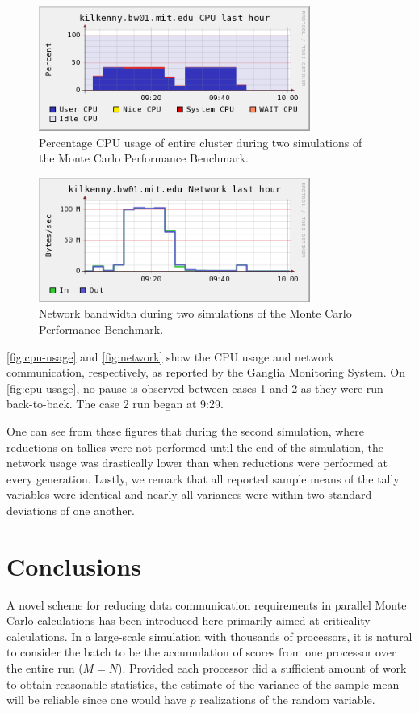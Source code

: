 \begin{figure}[ht]
  \centering
  \includegraphics[width=3.5in]{figures/ch4/cpu_usage.png}
  \caption{Percentage CPU usage of entire cluster during two simulations of the
    Monte Carlo Performance Benchmark.}
  \label{fig:cpu-usage}
\end{figure}
\begin{figure}[ht]
  \centering
  \includegraphics[width=3.5in]{figures/ch4/network.png}
  \caption{Network bandwidth during two simulations of the Monte Carlo
    Performance Benchmark.}
  \label{fig:network}
\end{figure}
\autoref{fig:cpu-usage} and \autoref{fig:network} show the CPU usage and network
communication, respectively, as reported by the Ganglia Monitoring System. On
\autoref{fig:cpu-usage}, no pause is observed between cases 1 and 2 as they were
run back-to-back. The case 2 run began at 9:29.

One can see from these figures that during the second simulation, where
reductions on tallies were not performed until the end of the simulation, the
network usage was drastically lower than when reductions were performed at every
generation. Lastly, we remark that all reported sample means of the tally
variables were identical and nearly all variances were within two standard
deviations of one another.

\section{Conclusions}

A novel scheme for reducing data communication requirements in parallel Monte
Carlo calculations has been introduced here primarily aimed at criticality
calculations. In a large-scale simulation with thousands of processors, it is
natural to consider the batch to be the accumulation of scores from one
processor over the entire run ($M = N$). Provided each processor did a
sufficient amount of work to obtain reasonable statistics, the estimate of the
variance of the sample mean will be reliable since one would have $p$
realizations of the random variable.

